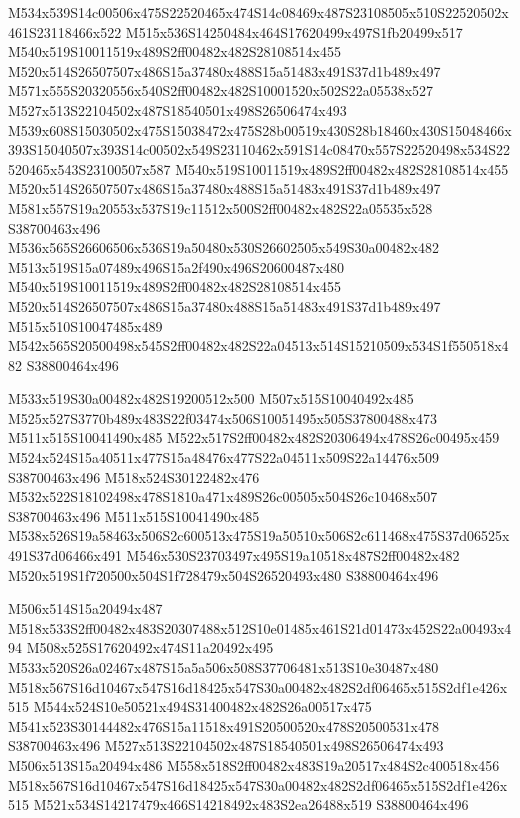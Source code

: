 \documentclass{article}
\begin{document}
\begin{multicols}{2}
M534x539S14c00506x475S22520465x474S14c08469x487S23108505x510S22520502x461S23118466x522 M515x536S14250484x464S17620499x497S1fb20499x517 M540x519S10011519x489S2ff00482x482S28108514x455 M520x514S26507507x486S15a37480x488S15a51483x491S37d1b489x497 M571x555S20320556x540S2ff00482x482S10001520x502S22a05538x527 M527x513S22104502x487S18540501x498S26506474x493 M539x608S15030502x475S15038472x475S28b00519x430S28b18460x430S15048466x393S15040507x393S14c00502x549S23110462x591S14c08470x557S22520498x534S22520465x543S23100507x587 M540x519S10011519x489S2ff00482x482S28108514x455 M520x514S26507507x486S15a37480x488S15a51483x491S37d1b489x497 M581x557S19a20553x537S19c11512x500S2ff00482x482S22a05535x528 S38700463x496 M536x565S26606506x536S19a50480x530S26602505x549S30a00482x482 M513x519S15a07489x496S15a2f490x496S20600487x480 M540x519S10011519x489S2ff00482x482S28108514x455 M520x514S26507507x486S15a37480x488S15a51483x491S37d1b489x497 M515x510S10047485x489 M542x565S20500498x545S2ff00482x482S22a04513x514S15210509x534S1f550518x482 S38800464x496

M533x519S30a00482x482S19200512x500 M507x515S10040492x485 M525x527S3770b489x483S22f03474x506S10051495x505S37800488x473 M511x515S10041490x485 M522x517S2ff00482x482S20306494x478S26c00495x459 M524x524S15a40511x477S15a48476x477S22a04511x509S22a14476x509 S38700463x496 M518x524S30122482x476 M532x522S18102498x478S1810a471x489S26c00505x504S26c10468x507 S38700463x496 M511x515S10041490x485 M538x526S19a58463x506S2c600513x475S19a50510x506S2c611468x475S37d06525x491S37d06466x491 M546x530S23703497x495S19a10518x487S2ff00482x482 M520x519S1f720500x504S1f728479x504S26520493x480 S38800464x496

M506x514S15a20494x487 M518x533S2ff00482x483S20307488x512S10e01485x461S21d01473x452S22a00493x494 M508x525S17620492x474S11a20492x495 M533x520S26a02467x487S15a5a506x508S37706481x513S10e30487x480 M518x567S16d10467x547S16d18425x547S30a00482x482S2df06465x515S2df1e426x515 M544x524S10e50521x494S31400482x482S26a00517x475 M541x523S30144482x476S15a11518x491S20500520x478S20500531x478 S38700463x496 M527x513S22104502x487S18540501x498S26506474x493 M506x513S15a20494x486 M558x518S2ff00482x483S19a20517x484S2c400518x456 M518x567S16d10467x547S16d18425x547S30a00482x482S2df06465x515S2df1e426x515 M521x534S14217479x466S14218492x483S2ea26488x519 S38800464x496


\end{multicols}
\end{document}
